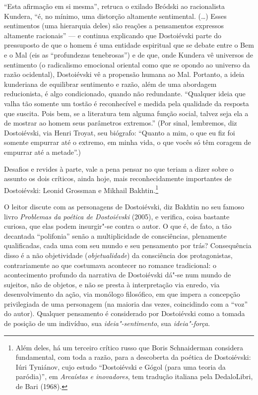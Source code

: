 ``Esta afirmação em si mesma'', retruca o exilado Bródski ao
racionalista Kundera, ``é, no mínimo, uma distorção altamente
sentimental. (\ldots{}) Esses sentimentos (uma hierarquia deles) são reações
a pensamentos expressos altamente racionais'' --- e continua explicando
que Dostoiévski parte do pressuposto de que o homem é uma entidade
espiritual que se debate entre o Bem e o Mal (eis as ``profundezas
tenebrosas'') e de que, onde Kundera vê universos de sentimento (o
radicalismo emocional oriental como que se opondo ao universo da razão
ocidental), Dostoiévski vê a propensão humana ao Mal. Portanto, a ideia
kunderiana de equilibrar sentimento e razão, além de uma abordagem
reducionista, é algo condi­cionado, quando não redundante. ``Qualquer
ideia que valha tão somente um tostão é reconhecível e medida pela
qualidade da resposta que suscita. Pois bem, se a literatura tem alguma
função social, talvez seja ela a de mostrar ao homem seus parâmetros
extremos.'' (Por sinal, lembremos, diz Dostoiévski, via Henri Troyat, seu biógrafo:
``Quanto a mim, o que eu fiz foi somente empurrar até o extremo, em
minha vida, o que vocês só têm coragem de empurrar até a metade''.)


Desafios e revides à parte, vale a pena pensar no que teriam a dizer
sobre o assunto os dois críticos, ainda hoje, mais reconhecidamente
importantes de Dostoiévski: Leonid Grossman e Mikhail Bakhtin.\footnote{Além deles, há um terceiro crítico russo que Boris Schnaiderman considera fundamental, com toda a razão, para a descoberta da poética de
Dostoiévski: Iúri Tyniánov, cujo estudo ``Dostoiévski e Gógol
(para uma teoria da paródia)'', em \emph{Arcaístas e inovadores},
tem tradução italiana pela DedaloLibri, de Bari (1968).}

O leitor discute com as personagens de Dostoiévski, diz Bakhtin no seu
famoso livro \emph{Problemas da poética de Dostoiévski} (2005), e
verifica, coisa bastante curiosa, que elas podem insurgir"-se contra o
autor. O que é, de fato, a tão decantada ``polifonia'' senão a
multiplicidade de consciências, plena­mente qualificadas, cada uma com
seu mundo e seu pensamento por trás? Consequência disso é a não
objetividade (\emph{objetualidade}) da consciência dos protagonistas,
contrariamente ao que costumava acontecer no romance tradicional: o
acontecimento profundo da narrativa de Dostoiévski dá"-se num mundo de
sujeitos, não de objetos, e não se presta à interpre­tação via enredo,
via desenvolvimento da ação, via monólogo filosófico, em que impera a
concepção privilegiada de uma personagem (na maioria das vezes,
coincidindo com a ``voz'' do autor). Qualquer pensamento é considerado
por Dostoiévski como a tomada de posição de um indivíduo, sua
\emph{ideia"-sentimento}, sua \emph{ideia"-força}.

